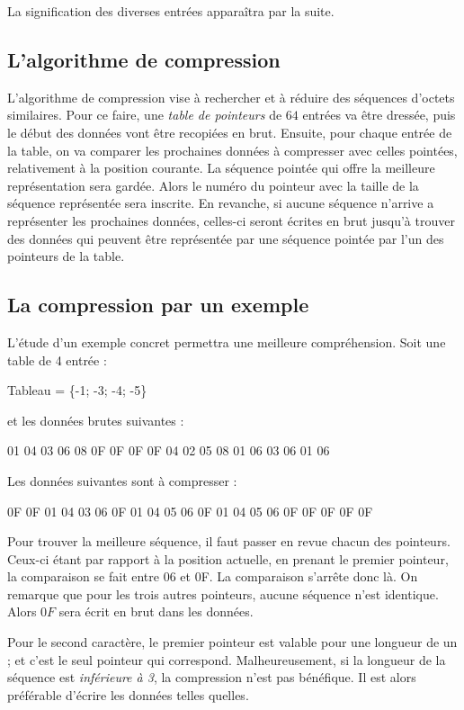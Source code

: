La signification des diverses entrées apparaîtra par la suite.

\subsection{L'algorithme de compression}
L'algorithme de compression vise à rechercher et à réduire des séquences
d'octets similaires. Pour ce faire, une \emph{table de pointeurs} de $64$
entrées va être dressée, puis le début des données vont être recopiées
en brut. Ensuite, pour chaque entrée de la table, on va comparer les
prochaines données à compresser avec celles pointées, relativement à la
position courante. La séquence pointée qui offre la meilleure
représentation sera gardée. Alors le numéro du pointeur avec la taille de
la séquence représentée sera inscrite. En revanche, si aucune séquence
n'arrive a représenter les prochaines données, celles-ci seront écrites
en brut jusqu'à trouver des données qui peuvent être représentée par une
séquence pointée par l'un des pointeurs de la table.

\subsection{La compression par un exemple}
L'étude d'un exemple concret permettra une meilleure compréhension. Soit une
table de 4 entrée :
\begin{exemple}
Tableau = \{-1; -3; -4; -5\}
\end{exemple}

et les données brutes suivantes :
\begin{exemple}
01 04 03 06 08 0F 0F 0F 0F 04 02 05 08 01 06 03 06 01 06
\end{exemple}

Les données suivantes sont à compresser :
\begin{exemple}
0F 0F 01 04 03 06 0F 01 04 05 06 0F 01 04 05 06 0F 0F 0F 0F 0F
\end{exemple}

Pour trouver la meilleure séquence, il faut passer en revue chacun des
pointeurs. Ceux-ci étant par rapport à la position actuelle, en prenant
le premier pointeur, la comparaison se fait entre 06 et 0F. La comparaison
s'arrête donc là. On remarque que pour les trois autres pointeurs, aucune
séquence n'est identique. Alors $0F$ sera écrit en brut dans les données.

Pour le second caractère, le premier pointeur est valable pour une longueur
de un ; et c'est le seul pointeur qui correspond. Malheureusement, si la
longueur de la séquence est \emph{inférieure à 3}, la compression n'est pas
bénéfique. Il est alors préférable d'écrire les données telles quelles.

